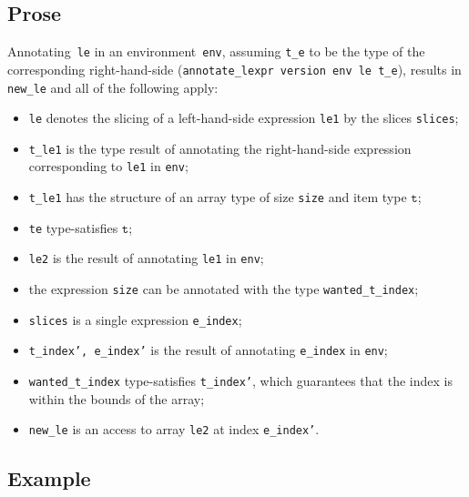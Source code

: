 \documentclass{book}
\newcommand\vt[0]{\texttt{t}}
\begin{document}
\begin{itemize}
  \subsection{Prose}
   Annotating~\texttt{le} in an environment~\texttt{env}, assuming
\texttt{t\_e} to be the type of the corresponding right-hand-side
(\texttt{annotate\_lexpr version env le t\_e}), results in \texttt{new\_le} and
all of the following apply:
   \begin{itemize}
   \item \texttt{le} denotes the slicing of a left-hand-side expression \texttt{le1} by the slices \texttt{slices};
   \item \texttt{t\_le1} is the type result of annotating the right-hand-side expression corresponding to \texttt{le1} in \texttt{env};
   \item \texttt{t\_le1} has the structure of an array type of size \texttt{size} and item type $\vt$;
   \item \texttt{te} type-satisfies $\vt$;
   \item \texttt{le2} is the result of annotating \texttt{le1} in \texttt{env};
  \item the expression \texttt{size} can be annotated with the type \texttt{wanted\_t\_index};
  \item \texttt{slices} is a single expression \texttt{e\_index};
   \item \texttt{t\_index', e\_index'} is the result of annotating \texttt{e\_index} in \texttt{env};
   \item \texttt{wanted\_t\_index} type-satisfies \texttt{t\_index'}, which guarantees that the index
   is within the bounds of the array;
   \item \texttt{new\_le} is an access to array \texttt{le2} at index \texttt{e\_index'}.
   \end{itemize}

  \subsection{Example}



\end{itemize}
\end{document}
